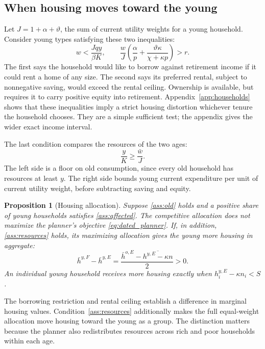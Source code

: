 \documentclass[11pt]{article}
\newtheorem{proposition}{Proposition}
\newcommand{\avg}[1]{\overline{#1}}
\begin{document}
\subsection{When housing moves toward the young}

Let $J=1+\alpha+\vartheta$, the sum of current utility weights for a young
household. Consider young types satisfying these two inequalities:
\begin{equation}
\boxed{\quad
w<\frac{Jqy}{\beta K},\qquad
\frac{w}{J}\left(\frac{\alpha}{p}
       +\frac{\vartheta\kappa}{\chi+\kappa p}\right)>r.
\quad}
\tag{A2}\label{ass:affected}
\end{equation}
The first says the household would like to borrow against retirement income
if it could rent a home of any size. The second says its preferred rental,
subject to nonnegative saving, would exceed the rental ceiling. Ownership is
available, but requires it to carry positive equity into retirement.
Appendix~\ref{app:households} shows that these inequalities imply a strict
housing distortion whichever tenure the household chooses. They are a
simple sufficient test; the appendix gives the wider exact income interval.

The last condition compares the resources of the two ages:
\begin{equation}
\boxed{\frac{y}{K}\ge\frac{\bar w}{J}.}
\tag{A3}\label{ass:resources}
\end{equation}
The left side is a floor on old consumption, since every old household has
resources at least $y$. The right side bounds young current expenditure per
unit of current utility weight, before subtracting saving and equity.

\begin{proposition}[Housing allocation]\label{prop:housing}
Suppose \eqref{ass:old} holds and a positive share of young households satisfies
\eqref{ass:affected}. The competitive allocation does not maximize the
planner's objective \eqref{eq:dated_planner}. If, in addition,
\eqref{ass:resources} holds, its maximizing allocation gives the young more
housing in aggregate:
\begin{equation}
\bar h^{y,F}-\bar h^{y,E}
 =\frac{\bar h^{o,E}-\avg{h^{y,E}-\kappa n}}{2}>0.
\label{eq:housing_change}
\end{equation}
An individual young household receives more housing exactly when
$h_i^{y,E}-\kappa n_i<S$.
\end{proposition}

The borrowing restriction and rental ceiling establish a difference in
marginal housing values. Condition~\eqref{ass:resources} additionally makes
the full equal-weight allocation move housing toward the young as a group.
The distinction matters because the planner also redistributes resources
across rich and poor households within each age.
\end{document}

